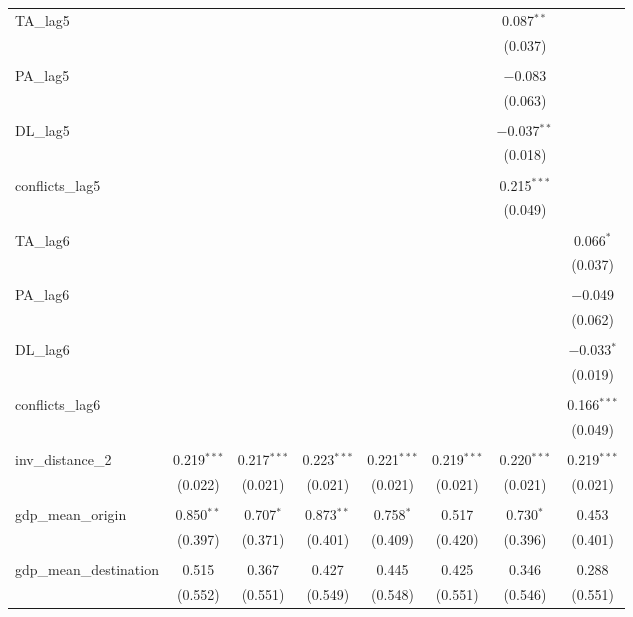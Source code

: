 \begin{table}[!htbp]
\begin{tabular}{@{\extracolsep{5pt}}lccccccc}
 TA\_lag5 &  &  &  &  &  & 0.087$^{**}$ &  \\ 
  &  &  &  &  &  & (0.037) &  \\ 
  & & & & & & & \\ 
 PA\_lag5 &  &  &  &  &  & $-$0.083 &  \\ 
  &  &  &  &  &  & (0.063) &  \\ 
  & & & & & & & \\ 
 DL\_lag5 &  &  &  &  &  & $-$0.037$^{**}$ &  \\ 
  &  &  &  &  &  & (0.018) &  \\ 
  & & & & & & & \\ 
 conflicts\_lag5 &  &  &  &  &  & 0.215$^{***}$ &  \\ 
  &  &  &  &  &  & (0.049) &  \\ 
  & & & & & & & \\ 
 TA\_lag6 &  &  &  &  &  &  & 0.066$^{*}$ \\ 
  &  &  &  &  &  &  & (0.037) \\ 
  & & & & & & & \\ 
 PA\_lag6 &  &  &  &  &  &  & $-$0.049 \\ 
  &  &  &  &  &  &  & (0.062) \\ 
  & & & & & & & \\ 
 DL\_lag6 &  &  &  &  &  &  & $-$0.033$^{*}$ \\ 
  &  &  &  &  &  &  & (0.019) \\ 
  & & & & & & & \\ 
 conflicts\_lag6 &  &  &  &  &  &  & 0.166$^{***}$ \\ 
  &  &  &  &  &  &  & (0.049) \\ 
  & & & & & & & \\ 
 inv\_distance\_2 & 0.219$^{***}$ & 0.217$^{***}$ & 0.223$^{***}$ & 0.221$^{***}$ & 0.219$^{***}$ & 0.220$^{***}$ & 0.219$^{***}$ \\ 
  & (0.022) & (0.021) & (0.021) & (0.021) & (0.021) & (0.021) & (0.021) \\ 
  & & & & & & & \\ 
 gdp\_mean\_origin & 0.850$^{**}$ & 0.707$^{*}$ & 0.873$^{**}$ & 0.758$^{*}$ & 0.517 & 0.730$^{*}$ & 0.453 \\ 
  & (0.397) & (0.371) & (0.401) & (0.409) & (0.420) & (0.396) & (0.401) \\ 
  & & & & & & & \\ 
 gdp\_mean\_destination & 0.515 & 0.367 & 0.427 & 0.445 & 0.425 & 0.346 & 0.288 \\ 
  & (0.552) & (0.551) & (0.549) & (0.548) & (0.551) & (0.546) & (0.551) \\ 

\end{tabular}
\end{table}
